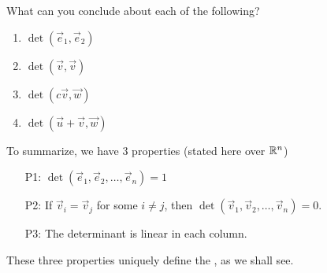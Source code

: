 \begin{applicationActivities}{1}{26}
\begin{activity}{0}
\begin{minipage}{0.8\textwidth}
\begin{multicols}{2}
\begin{center}
\end{center}

\begin{center}
\end{center}

\end{multicols}
\end{minipage}

\end{activity}

\begin{activity}{0}
What can you conclude about each of the following?
\begin{enumerate}
\item $\det(\vec{e}_1,\vec{e}_2)$
\item $\det(\vec{v},\vec{v})$
\item $\det(c\vec{v},\vec{w})$
\item $\det(\vec{u}+\vec{v},\vec{w})$
\end{enumerate}
\end{activity}


\begin{definition}
To summarize, we have 3 properties (stated here over $\mathbb{R}^n$)
\begin{enumerate}
\item [P1:] $\det(\vec{e}_1,\vec{e}_2,\ldots,\vec{e}_n)=1$
\item [P2:] If $\vec{v}_i = \vec{v}_j$ for some $i \neq j$, then $\det(\vec{v}_1,\vec{v}_2,\ldots,\vec{v}_n)=0$.
\item[P3:] The determinant is linear in each column.
\end{enumerate}

These three properties uniquely define the , as we shall see.
\end{definition}


\end{applicationActivities}
